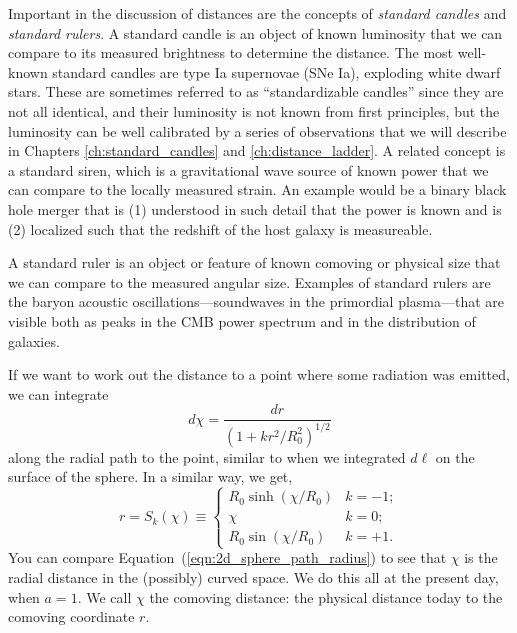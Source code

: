 Important in the discussion of distances are the concepts of \textit{standard candles} and \textit{standard rulers}.  A standard candle is an object of known luminosity that we can compare to its measured brightness to determine the distance.  The most well-known standard candles are type Ia supernovae (SNe Ia), exploding white dwarf stars.  These are sometimes referred to as ``standardizable candles'' since they are not all identical, and their luminosity is not known from first principles, but the luminosity can be well calibrated by a series of observations that we will describe in Chapters \ref{ch:standard_candles} and \ref{ch:distance_ladder}.  A related concept is a standard siren, which is a gravitational wave source of known power that we can compare to the locally measured strain.  An example would be a binary black hole merger that is (1) understood in such detail that the power is known and is (2) localized such that the redshift of the host galaxy is measureable.

A standard ruler is an object or feature of known comoving or physical size that we can compare to the measured angular size.  Examples of standard rulers are the baryon acoustic oscillations---soundwaves in the primordial plasma---that are visible both as peaks in the CMB power spectrum and in the distribution of galaxies.  

If we want to work out the distance to a point where some radiation was emitted, we can integrate
\begin{equation}
  d\chi = \frac{dr}{(1 + kr^2/R_0^2)^{1/2}}
\end{equation}
along the radial path to the point, similar to when we integrated $d\ell$ on the surface of the sphere.  In a similar way, we get, 
\begin{equation}
  r = S_k(\chi) \equiv \left\{
  \begin{array}{ll}
    R_0 \sinh(\chi/R_0) &  k=-1; \\
    \chi & k=0; \\
    R_0 \sin(\chi/R_0) &  k=+1.
  \end{array}
  \right.
\end{equation}
You can compare Equation~(\ref{eqn:2d_sphere_path_radius}) to see that $\chi$ is the radial distance in the (possibly) curved space.  We do this all at the present day, when $a=1$.  We call $\chi$ the comoving distance: the physical distance today to the comoving coordinate $r$.


